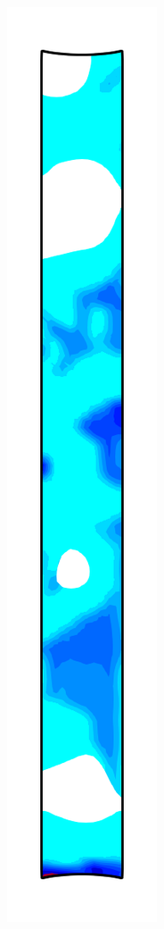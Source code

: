 \begin{figure}[!htb]
\begin{subfigure}{0.08\textwidth}
  \end{subfigure}
  \begin{subfigure}{0.08\textwidth}
    \centering
    \includegraphics[width=\textwidth]{Chapter5/figures/spallation/c_10}

\end{subfigure}
\end{figure}
